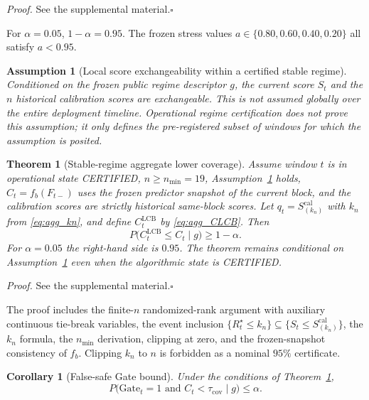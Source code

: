 \documentclass[letterpaper,journal]{IEEEtran}
\newtheorem{theorem}{Theorem}
\newtheorem{assumption}{Assumption}
\newtheorem{corollary}{Corollary}
\begin{document}
\noindent\emph{Proof.}
See the supplemental material.\hfill$\square$

For $\alpha=0.05$, $1-\alpha=0.95$.  The frozen stress values
$a\in\{0.80,0.60,0.40,0.20\}$ all satisfy $a<0.95$.

\begin{assumption}[Local score exchangeability within a certified stable regime]
\label{ass:score-exchangeability}
Conditioned on the frozen public regime descriptor $g$, the current score
$S_t$ and the $n$ historical calibration scores are exchangeable.  This is
not assumed globally over the entire deployment timeline.  Operational
regime certification does not prove this assumption; it only defines the
pre-registered subset of windows for which the assumption is posited.
\end{assumption}

\begin{theorem}[Stable-regime aggregate lower coverage]
\label{thm:agg-lcb}
Assume window $t$ is in operational state CERTIFIED, $n\ge n_{\min}=19$,
Assumption~\ref{ass:score-exchangeability} holds, $\widehat C_t=f_b(F_{t-})$
uses the frozen predictor snapshot of the current block, and the calibration
scores are strictly historical same-block scores.  Let
$q_t=S_{(k_n)}^{\mathrm{cal}}$ with $k_n$ from \eqref{eq:agg_kn}, and define
$C^{\mathrm{LCB}}_t$ by \eqref{eq:agg_CLCB}.  Then
\begin{equation}
 P\bigl(C^{\mathrm{LCB}}_t\le C_t\mid g\bigr)\ge 1-\alpha.
 \label{eq:agg_thm1}
\end{equation}
For $\alpha=0.05$ the right-hand side is $0.95$.  The theorem remains
conditional on Assumption~\ref{ass:score-exchangeability} even when the
algorithmic state is CERTIFIED.
\end{theorem}

\noindent\emph{Proof.}
See the supplemental material.\hfill$\square$

The proof includes the finite-$n$ randomized-rank argument with auxiliary
continuous tie-break variables, the event inclusion
$\{R_t^\star\le k_n\}\subseteq\{S_t\le S_{(k_n)}^{\mathrm{cal}}\}$,
the $k_n$ formula, the $n_{\min}$ derivation, clipping at zero, and the
frozen-snapshot consistency of $f_b$.  Clipping $k_n$ to $n$ is forbidden as a
nominal $95\%$ certificate.

\begin{corollary}[False-safe Gate bound]
\label{cor:false-safe-gate}
Under the conditions of Theorem~\ref{thm:agg-lcb},
\begin{equation}
 P\bigl(\mathrm{Gate}_t=1\text{ and }C_t<\tau_{\mathrm{cov}}\mid g\bigr)
 \le\alpha.
 \label{eq:agg_cor2}
\end{equation}
\end{corollary}
\end{document}
